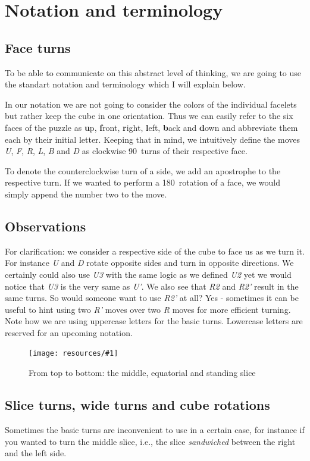 \documentclass[a4paper]{scrreprt}
\newcommand{\wrapfig}[5] {
	\begin{figure}
	\centering
	\texttt{[image: resources/\#1]}
	\caption*{#5}
	\end{figure}
}
\begin{document}
\section{Notation and terminology}
\subsection{Face turns}
To be able to communicate on this abstract level of thinking, we are going to use the standart notation and terminology which I will explain below.\par
In our notation we are not going to consider the colors of the individual facelets but rather keep the cube in one orientation. Thus we can easily refer to the six faces of the puzzle as \textbf{u}p, \textbf{f}ront, \textbf{r}ight, \textbf{l}eft, \textbf{b}ack and \textbf{d}own and abbreviate them each by their initial letter. Keeping that in mind, we intuitively define the moves \emph{U}, \emph{F}, \emph{R}, \emph{L}, \emph{B} and \emph{D} as clockwise 90\textdegree\ turns of their respective face.\par
To denote the counterclockwise turn of a side, we add an apostrophe to the respective turn. If we wanted to perform a 180\textdegree\ rotation of a face, we would simply append the number two to the move.


\subsection{Observations}
For clarification: we consider a respective side of the cube to face us as we turn it. For instance \emph{U} and \emph{D} rotate opposite sides and turn in opposite directions. We certainly could also use \emph{U3} with the same logic as we defined \emph{U2} yet we would notice that \emph{U3} is the very same as \emph{U'}. We also see that \emph{R2} and \emph{R2'} result in the same turns. So would someone want to use \emph{R2'} at all? Yes - sometimes it can be useful to hint using two \emph{R'} moves over two \emph{R} moves for more efficient turning. Note how we are using uppercase letters for the basic turns. Lowercase letters are reserved for an upcoming notation.

\wrapfig{slices.png}{R}{0.35}{0.3}{From top to bottom: the middle, equatorial and standing slice}

\subsection{Slice turns, wide turns and cube rotations}
Sometimes the basic turns are inconvenient to use in a certain case, for instance if you wanted to turn the middle slice, i.e., the slice \emph{sandwiched} between the right and the left side.\par
\end{document}
